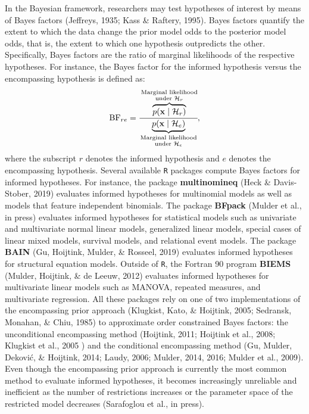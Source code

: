 \documentclass[
  english,
  man,floatsintext]{apa6}
\begin{document}
In the Bayesian framework, researchers may test hypotheses of interest by means of Bayes factors (Jeffreys, 1935; Kass \& Raftery, 1995). Bayes factors quantify the extent to which the data change the prior model odds to the posterior model odds, that is, the extent to which one hypothesis outpredicts the other. Specifically, Bayes factors are the ratio of marginal likelihoods of the respective hypotheses. For instance, the Bayes factor for the informed hypothesis versus the encompassing hypothesis is defined as:
\begin{align*}
\text{BF}_{re} = \cfrac{\overbrace{p(\mathbf{x}\mid \mathcal{H}_r)}^{\substack{\text{Marginal likelihood}\\\text{under $\mathcal{H}_r$}}}}{\underbrace{p(\mathbf{x}\mid \mathcal{H}_e)}_{\substack{\text{Marginal likelihood}\\\text{under $\mathcal{H}_e$}}}},
\end{align*}
where the subscript \(r\) denotes the informed hypothesis and \(e\) denotes the encompassing hypothesis. Several available \texttt{R} packages compute Bayes factors for informed hypotheses. For instance, the package \textbf{multinomineq} (Heck \& Davis-Stober, 2019) evaluates informed hypotheses for multinomial models as well as models that feature independent binomials. The package \textbf{BFpack} (Mulder et al., in press) evaluates informed hypotheses for statistical models such as univariate and multivariate normal linear models, generalized linear models, special cases of linear mixed models, survival models, and relational event models. The package \textbf{BAIN} (Gu, Hoijtink, Mulder, \& Rosseel, 2019) evaluates informed hypotheses for structural equation models. Outside of \texttt{R}, the Fortran 90 program \textbf{BIEMS} (Mulder, Hoijtink, \& de Leeuw, 2012) evaluates informed hypotheses for multivariate linear models such as MANOVA, repeated measures, and multivariate regression. All these packages rely on one of two implementations of the encompassing prior approach (Klugkist, Kato, \& Hoijtink, 2005; Sedransk, Monahan, \& Chiu, 1985) to approximate order constrained Bayes factors: the unconditional encompassing method (Hoijtink, 2011; Hoijtink et al., 2008; Klugkist et al., 2005 ) and the conditional encompassing method (Gu, Mulder, Deković, \& Hoijtink, 2014; Laudy, 2006; Mulder, 2014, 2016; Mulder et al., 2009). Even though the encompassing prior approach is currently the most common method to evaluate informed hypotheses, it becomes increasingly unreliable and inefficient as the number of restrictions increases or the parameter space of the restricted model decreases (Sarafoglou et al., in press).
\end{document}
